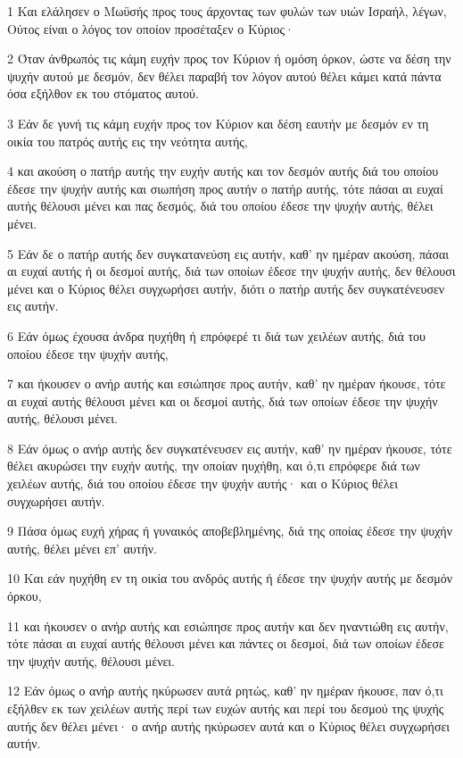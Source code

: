 \par 1 Και ελάλησεν ο Μωϋσής προς τους άρχοντας των φυλών των υιών Ισραήλ, λέγων, Ούτος είναι ο λόγος τον οποίον προσέταξεν ο Κύριος·
\par 2 Όταν άνθρωπός τις κάμη ευχήν προς τον Κύριον ή ομόση όρκον, ώστε να δέση την ψυχήν αυτού με δεσμόν, δεν θέλει παραβή τον λόγον αυτού θέλει κάμει κατά πάντα όσα εξήλθον εκ του στόματος αυτού.
\par 3 Εάν δε γυνή τις κάμη ευχήν προς τον Κύριον και δέση εαυτήν με δεσμόν εν τη οικία του πατρός αυτής εις την νεότητα αυτής,
\par 4 και ακούση ο πατήρ αυτής την ευχήν αυτής και τον δεσμόν αυτής διά του οποίου έδεσε την ψυχήν αυτής και σιωπήση προς αυτήν ο πατήρ αυτής, τότε πάσαι αι ευχαί αυτής θέλουσι μένει και πας δεσμός, διά του οποίου έδεσε την ψυχήν αυτής, θέλει μένει.
\par 5 Εάν δε ο πατήρ αυτής δεν συγκατανεύση εις αυτήν, καθ' ην ημέραν ακούση, πάσαι αι ευχαί αυτής ή οι δεσμοί αυτής, διά των οποίων έδεσε την ψυχήν αυτής, δεν θέλουσι μένει και ο Κύριος θέλει συγχωρήσει αυτήν, διότι ο πατήρ αυτής δεν συγκατένευσεν εις αυτήν.
\par 6 Εάν όμως έχουσα άνδρα ηυχήθη ή επρόφερέ τι διά των χειλέων αυτής, διά του οποίου έδεσε την ψυχήν αυτής,
\par 7 και ήκουσεν ο ανήρ αυτής και εσιώπησε προς αυτήν, καθ' ην ημέραν ήκουσε, τότε αι ευχαί αυτής θέλουσι μένει και οι δεσμοί αυτής, διά των οποίων έδεσε την ψυχήν αυτής, θέλουσι μένει.
\par 8 Εάν όμως ο ανήρ αυτής δεν συγκατένευσεν εις αυτήν, καθ' ην ημέραν ήκουσε, τότε θέλει ακυρώσει την ευχήν αυτής, την οποίαν ηυχήθη, και ό,τι επρόφερε διά των χειλέων αυτής, διά του οποίου έδεσε την ψυχήν αυτής· και ο Κύριος θέλει συγχωρήσει αυτήν.
\par 9 Πάσα όμως ευχή χήρας ή γυναικός αποβεβλημένης, διά της οποίας έδεσε την ψυχήν αυτής, θέλει μένει επ' αυτήν.
\par 10 Και εάν ηυχήθη εν τη οικία του ανδρός αυτής ή έδεσε την ψυχήν αυτής με δεσμόν όρκου,
\par 11 και ήκουσεν ο ανήρ αυτής και εσιώπησε προς αυτήν και δεν ηναντιώθη εις αυτήν, τότε πάσαι αι ευχαί αυτής θέλουσι μένει και πάντες οι δεσμοί, διά των οποίων έδεσε την ψυχήν αυτής, θέλουσι μένει.
\par 12 Εάν όμως ο ανήρ αυτής ηκύρωσεν αυτά ρητώς, καθ' ην ημέραν ήκουσε, παν ό,τι εξήλθεν εκ των χειλέων αυτής περί των ευχών αυτής και περί του δεσμού της ψυχής αυτής δεν θέλει μένει· ο ανήρ αυτής ηκύρωσεν αυτά και ο Κύριος θέλει συγχωρήσει αυτήν.
